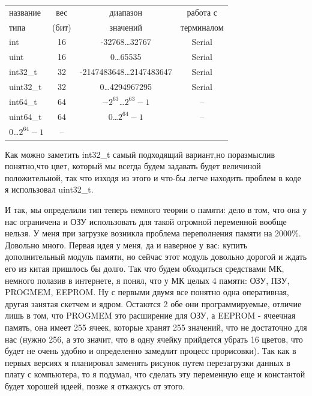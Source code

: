 \documentclass[a4paper, 12pt]{article}
\begin{document}
\begin{center}
  \begin{tabular}{|l|c|c|c|}
    \hline
    название                & вес   & диапазон                   & работа с   \\
    типа                    & (бит) & значений                   & терминалом \\
    \hline
    int                     & 16    & -32768\dots32767           & Serial     \\
    \hline
    uint                    & 16    & 0\dots65535                & Serial     \\
    \hline
    int32\_t                & 32    & -2147483648\dots2147483647 & Serial     \\
    \hline
    uint32\_t               & 32    & 0\dots4294967295           & Serial     \\
    \hline
    int64\_t                & 64    & $-2^{63}$\dots$2^{63}-1$   & --         \\
    \hline
    uint64\_t               & 64    & 0\dots$2^{64}-1$           & --         \\
    \hline 0\dots$2^{64}-1$ & --                                              \\
    \hline
  \end{tabular}
\end{center}
Как можно заметить int32\_t самый подходящий вариант,но поразмыслив понятно,что
цвет, который мы всегда будем задавать будет величиной положительной, так что
изходя из этого и что-бы легче находить проблем в коде я использовал uint32\_t.

И так, мы определили тип теперь немного теории о памяти: дело в том, что она у
нас ограничена и ОЗУ использовать для такой огромной переменной вообще нельзя.
У меня при загрузке возникла проблема переполнения памяти на 2000\%. Довольно
много. Первая идея у меня, да и наверное у вас: купить дополнительный модуль
памяти, но сейчас этот модуль довольно дорогой и ждать его из китая пришлось
бы долго. Так что будем обходиться средствами МК, немного полазив в интернете,
я понял, что у МК целых 4 памяти: ОЗУ, ПЗУ, PROGMEM, EEPROM. Ну с первыми двумя
все понятно одна оперативная, другая занятая скетчем и ядром. Остаются 2
обе они программируемые, отличие лишь в том, что PROGMEM это расширение для
ОЗУ, а EEPROM - ячеечная память, она имеет 255 ячеек, которые хранят 255
значений, что не достаточно для нас (нужно 256, а это значит, что в одну
ячейку прийдется убрать 16 цветов, что будет не очень удобно и определенно
замедлит процесс прорисовки). Так как в первых версиях я планировал заменять
рисунок путем перезагрузки данных в плату с компьютера, то я подумал, что
сделать эту переменную еще и константой будет хорошей идеей, позже я откажусь
от этого.
\end{document}
